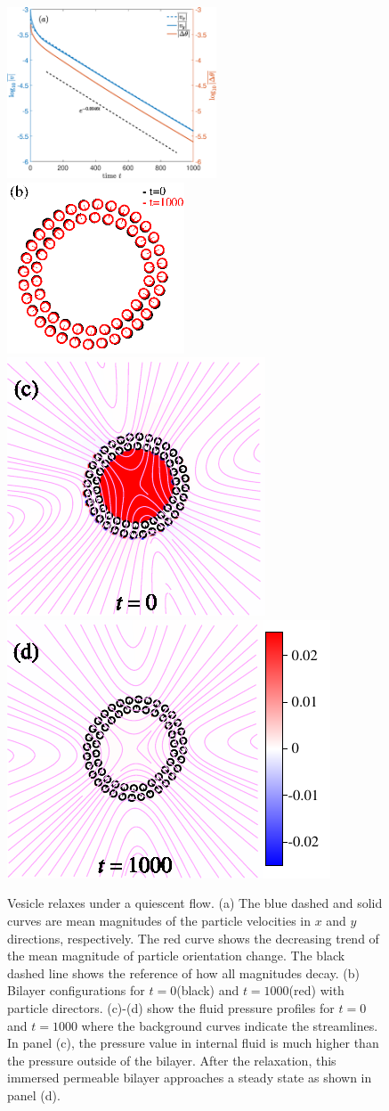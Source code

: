 \documentclass[lineno]{jfm}
\begin{document}
\begin{figure}
\centering
\includegraphics[height=2in]{relax.eps}
\includegraphics[height=2in]{relax2.eps}\\
\includegraphics[height=2.in]{N58_0pres.pdf}
\includegraphics[height=2.in]{N58_5000pres.pdf}
  \caption{Vesicle relaxes under a quiescent flow. (a) The blue dashed and solid curves are mean magnitudes of the particle velocities in $x$ and $y$ directions, respectively. The red curve shows the decreasing trend of the mean magnitude of particle orientation change. The black dashed line shows the reference of how all magnitudes decay. (b) Bilayer configurations for $t=0$(black) and $t=1000$(red) with particle directors.
  (c)-(d) show the fluid pressure profiles for $t=0$ and $t=1000$ where the background curves indicate the streamlines. In panel (c), the pressure value in internal fluid is much higher than the pressure outside of the bilayer. After the relaxation, this immersed permeable bilayer approaches a steady state as shown in panel (d).
  }
    \label{figure2}
\end{figure}
\end{document}
